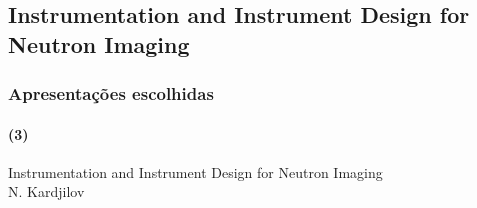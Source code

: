\documentclass[svgnames,smaller,table]{beamer}
\begin{document}
%    

\begin{frame}
  
\end{frame}

\begin{frame}
  
\end{frame}

\begin{frame}
  
\end{frame}

\begin{frame}
  
\end{frame}

\begin{frame}
  
\end{frame}

\begin{frame}
  
\end{frame}

\subsection{Instrumentation and Instrument Design for Neutron Imaging}
\begin{frame}
  \frametitle{Apresentações escolhidas}
  \framesubtitle{(3)}
  \begin{center}
    Instrumentation and Instrument Design for Neutron Imaging\\
    \vspace{2.0cm}
    N. Kardjilov
  \end{center}
\end{frame}
\end{document}

